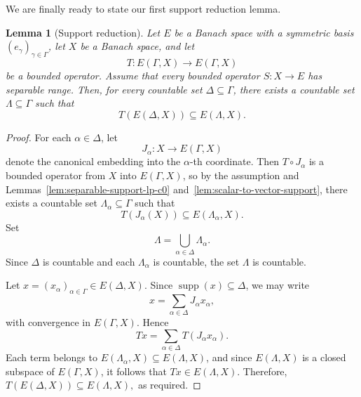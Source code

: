 \documentclass[11pt]{amsart}
\theoremstyle{plain}
\newtheorem{lemma}[theorem]{Lemma}
\theoremstyle{definition}
\numberwithin{equation}{section}
\newcommand{\supp}{\operatorname{supp}}
\begin{document}
We are finally ready to state our first support reduction lemma.

\begin{lemma}[Support reduction]\label{lem:operator-countable-general}
    Let $E$ be a Banach space with a symmetric basis $(e_\gamma)_{\gamma\in\Gamma}$, let $X$ be a Banach space, and let
    \begin{equation*}
        T \colon E(\Gamma,X)\to E(\Gamma,X)
    \end{equation*}
    be a bounded operator. Assume that every bounded operator $S\colon X\to E$ has separable range. Then, for every countable set $\Delta\subseteq\Gamma$, there exists a countable set $\Lambda\subseteq\Gamma$ such that
    \begin{equation*}
        T(E(\Delta,X))\subseteq E(\Lambda,X).
    \end{equation*}
\end{lemma}

\begin{proof}
    For each $\alpha\in\Delta$, let
    \begin{equation*}
        J_\alpha \colon X \to E(\Gamma,X)
    \end{equation*}
    denote the canonical embedding into the $\alpha$-th coordinate. Then $T\circ J_\alpha$ is a bounded operator from $X$ into $E(\Gamma,X)$, so by the assumption and Lemmas~\ref{lem:separable-support-lp-c0} and~\ref{lem:scalar-to-vector-support}, there exists a countable set $\Lambda_\alpha\subseteq \Gamma$ such that
    \begin{equation*}
        T(J_\alpha(X))\subseteq E(\Lambda_\alpha,X).
    \end{equation*}
    Set
    \begin{equation*}
        \Lambda=\bigcup_{\alpha\in\Delta}\Lambda_\alpha.
    \end{equation*}
    Since $\Delta$ is countable and each $\Lambda_\alpha$ is countable, the set $\Lambda$ is countable.

    Let $x=(x_\alpha)_{\alpha\in\Gamma}\in E(\Delta,X)$. Since $\supp(x)\subseteq\Delta$, we may write
    \begin{equation*}
        x=\sum_{\alpha\in\Delta} J_\alpha x_\alpha,
    \end{equation*}
    with convergence in $E(\Gamma,X)$. Hence
    \begin{equation*}
        T x=\sum_{\alpha\in\Delta} T(J_\alpha x_\alpha).
    \end{equation*}
    Each term belongs to $E(\Lambda_\alpha,X)\subseteq E(\Lambda,X)$, and since $E(\Lambda,X)$ is a closed subspace of $E(\Gamma,X)$, it follows that
    \(
        T x\in E(\Lambda,X).
    \)
    Therefore,
    \(
        T(E(\Delta,X))\subseteq E(\Lambda,X),
    \)
    as required.
\end{proof}
\end{document}
